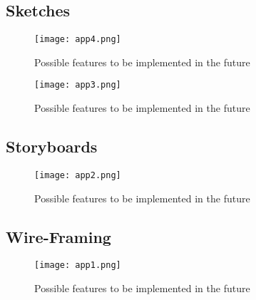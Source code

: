  \newpage


\begin{landscape}
\subsection{Sketches}
 \begin{figure}[H]
      \centering
      \texttt{[image: app4.png]}
      \caption{Possible features to be implemented in the future}
 \end{figure}
\end{landscape}

 \newpage

\begin{landscape}
 \begin{figure}[H]
      \centering
      \texttt{[image: app3.png]}
      \caption{Possible features to be implemented in the future}
 \end{figure}
  \end{landscape}

\newpage

\begin{landscape}
\subsection{Storyboards}
 \begin{figure}[H]
      \centering
      \texttt{[image: app2.png]}
      \caption{Possible features to be implemented in the future}
 \end{figure}
\end{landscape}

 \newpage

\begin{landscape}
\subsection{Wire-Framing}
\begin{figure}[H]
      \centering
      \texttt{[image: app1.png]}
      \caption{Possible features to be implemented in the future}
 \end{figure}
 \end{landscape}

